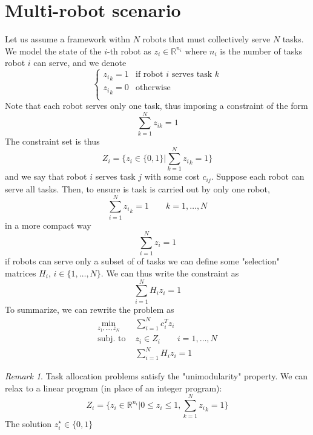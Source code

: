 \documentclass{book}
\newcommand{\R}{\mathbb{R}}
\theoremstyle{theoremv2}
\theoremstyle{defv2}
\theoremstyle{remark}
\newtheorem*{remark}{Remark}
\theoremstyle{remark}
\theoremstyle{definition}
\theoremstyle{definition}
\begin{document}
\section{Multi-robot scenario}
Let us assume a framework withn $N$ robots that must collectively serve $N$ tasks. We model the state of the $i$-th robot as $z_i\in\R^{n_i}$ where $n_i$ is the number of tasks robot $i$ can serve, and we denote \[
    \begin{cases}
        {z_i}_k=1 & \text{if robot $i$ serves task $k$}\\
        {z_i}_k=0 & \text{otherwise}\\
    \end{cases}
\]
Note that each robot serves only one task, thus imposing a constraint of the form
\[
    \displaystyle\sum_{k=1}^{N}z_{ik} = 1
\]
The constraint set is thus
\[
    Z_i = \{z_i\in\{0,1\}| \displaystyle\sum_{k=1}^{N}{z_i}_k=1\} 
\]
and we say that robot $i$ serves task $j$ with some cost $c_{ij}$. 
Suppose each robot can serve all tasks. Then, to ensure is task is carried out by only one robot,
\[
    \displaystyle\sum_{i=1}^{N}{z_{i}}_k = 1 \qquad k=1,\dots,N
\]
in a more compact way 
\[
    \displaystyle\sum_{i=1}^{N}z_i=1
\]
if robots can serve only a subset of of tasks we can define some "selection" matrices $H_i$, $i\in\{1,\dots,N\}$. We can thus write the constraint as 
\[
    \displaystyle\sum_{i=1}^{N} H_iz_i = 1
\]
To summarize, we can rewrite the problem as 
\begin{align*}
    \min_{z_1,\dots,z_N} &  \displaystyle\sum_{i=1}^{N} c_i^Tz_i \\
    \text{subj. to } & z_i\in Z_i \qquad i=1,\dots,N\\ 
                     &\displaystyle\sum_{i=1}^{N} H_i z_i = 1
\end{align*}

\begin{remark}
    Task allocation problems satisfy the "unimodularity" property. We can relax to a linear program (in place of an integer program):
    \[
        Z_i = \{z_i\in\R^{n_i} | 0\leq z_i\leq1, \displaystyle\sum_{k=1}^{N}{z_{i}}_k=1\}
    \]
    The solution $z_i^\star\in\{0,1\}$
\end{remark}
\end{document}
